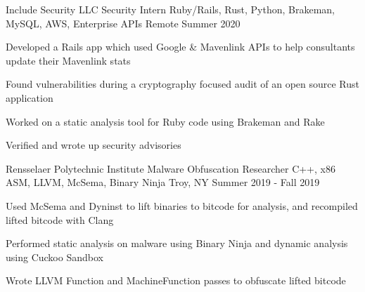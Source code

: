 \begin{cventries}
  \cventry
    {Include Security LLC}
    {Security Intern}
    {Ruby/Rails, Rust, Python, Brakeman, MySQL, AWS, Enterprise APIs}
    {Remote}
    {Summer 2020}
    {
      \begin{cvitems}
        \item {Developed a Rails app which used Google \& Mavenlink APIs to help consultants update their Mavenlink stats}
        \item {Found vulnerabilities during a cryptography focused audit of an open source Rust application}
        \item {Worked on a static analysis tool for Ruby code using Brakeman and Rake}
        \item {Verified and wrote up security advisories}
      \end{cvitems}
    }
    
  \cventry
    {Rensselaer Polytechnic Institute}
    {Malware Obfuscation Researcher}
    {C++, x86 ASM, LLVM, McSema, Binary Ninja}
    {Troy, NY}
    {Summer 2019 - Fall 2019}
    {
      \begin{cvitems}
        \item {Used McSema and Dyninst to lift binaries to bitcode for analysis, and recompiled lifted bitcode with Clang}
        \item {Performed static analysis on malware using Binary Ninja and dynamic analysis using Cuckoo Sandbox}
        \item {Wrote LLVM Function and MachineFunction passes to obfuscate lifted bitcode}
      \end{cvitems}
    }
\end{cventries}
